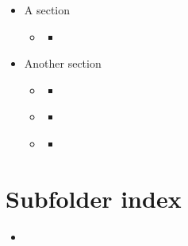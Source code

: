 

\pagestyle{empty}
\sphinxmaketitle
\pagestyle{plain}
\sphinxtableofcontents
\pagestyle{normal}
\label{\detokenize{index::doc}}


\begin{itemize}
\item{} 
A section

\begin{itemize}
\item{}{\hyperref[\detokenize{subfolder/index::doc}]{}}

\begin{itemize}
\item{}{\hyperref[\detokenize{subfolder/asubpage::doc}]{}}

\end{itemize}
\end{itemize}
\item{} 
Another section

\begin{itemize}
\item{}{\hyperref[\detokenize{content1::doc}]{}}

\begin{itemize}
\item{}{\hyperref[\detokenize{subfolder/asubpage::doc}]{}}

\end{itemize}
\item{}{\hyperref[\detokenize{content2::doc}]{}}

\begin{itemize}
\item{}{\hyperref[\detokenize{subfolder/asubpage::doc}]{}}

\end{itemize}
\item{}{\hyperref[\detokenize{content3::doc}]{}}

\begin{itemize}
\item{}{\hyperref[\detokenize{subfolder/asubpage::doc}]{}}

\end{itemize}
\end{itemize}
\end{itemize}


\chapter{Subfolder index}
\label{\detokenize{subfolder/index:subfolder-index}}\label{\detokenize{subfolder/index::doc}}
\begin{itemize}
\item{}{\hyperref[\detokenize{subfolder/asubpage::doc}]{}}

\end{itemize}


